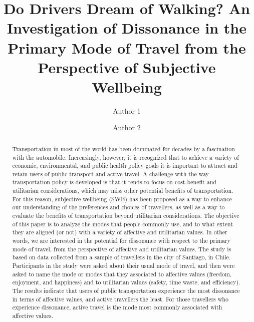\documentclass[]{elsarticle} %
\begin{document}
\begin{frontmatter}

  \title{Do Drivers Dream of Walking? An Investigation of Dissonance in the
Primary Mode of Travel from the Perspective of Subjective Wellbeing}
    \author[Some University]{Author 1}
    \author[Some School]{Author 2}
  
      \address[Some University]{Department, Street, City, State, Zip}
    \address[Some School]{Department, Street, City, State, Zip}
  
  \begin{abstract}
  Transportation in most of the world has been dominated for decades by a
  fascination with the automobile. Increasingly, however, it is recognized
  that to achieve a variety of economic, environmental, and public health
  policy goals it is important to attract and retain users of public
  transport and active travel. A challenge with the way transportation
  policy is developed is that it tends to focus on cost-benefit and
  utilitarian considerations, which may miss other potential benefits of
  transportation. For this reason, subjective wellbeing (SWB) has been
  proposed as a way to enhance our understanding of the preferences and
  choices of travellers, as well as a way to evaluate the benefits of
  transportation beyond utilitarian considerations. The objective of this
  paper is to analyze the modes that people commonly use, and to what
  extent they are aligned (or not) with a variety of affective and
  utilitarian values. In other words, we are interested in the potential
  for dissonance with respect to the primary mode of travel, from the
  perspective of affective and utilitarian values. The study is based on
  data collected from a sample of travellers in the city of Santiago, in
  Chile. Participants in the study were asked about their usual mode of
  travel, and then were asked to name the mode or modes that they
  associated to affective values (freedom, enjoyment, and happiness) and
  to utilitarian values (safety, time waste, and efficiency). The results
  indicate that users of public transportation experience the most
  dissonance in terms of affective values, and active travellers the
  least. For those travellers who experience dissonance, active travel is
  the mode most commonly associated with affective values.
  

\end{abstract}
\end{frontmatter}
\end{document}
